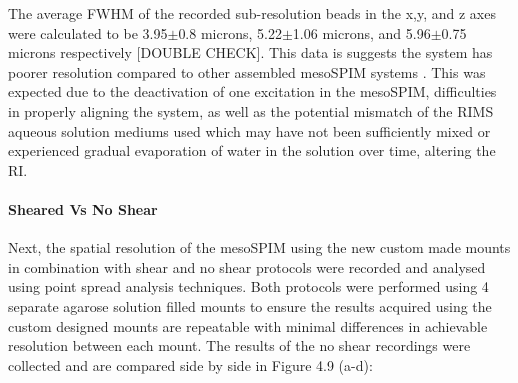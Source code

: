 The average FWHM of the recorded sub-resolution beads in the x,y, and z axes were calculated to be 3.95$\pm$0.8 microns, 5.22$\pm$1.06 microns, and 5.96$\pm$0.75 microns respectively [DOUBLE CHECK]. This data is suggests the system has poorer resolution compared to other assembled mesoSPIM systems \cite{voigt_mesospim_2019}. This was expected due to the deactivation of one excitation in the mesoSPIM, difficulties in properly aligning the system, as well as the potential mismatch of the RIMS aqueous solution mediums used which may have not been sufficiently mixed or experienced gradual evaporation of water in the solution over time, altering the RI.

\paragraph{Sheared Vs No Shear}
Next, the spatial resolution of the mesoSPIM using the new custom made mounts in combination with shear and no shear protocols were recorded and analysed using point spread analysis techniques. Both protocols were performed using 4 separate agarose solution filled mounts to ensure the results acquired using the custom designed mounts are repeatable with minimal differences in achievable resolution between each mount. The results of the no shear recordings were collected and are compared side by side in Figure 4.9 (a-d):

